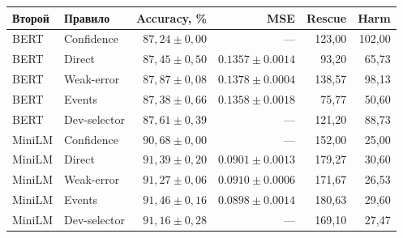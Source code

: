 \begin{tabular}{llrrrr}
\toprule
Второй & Правило & Accuracy, \% & MSE & Rescue & Harm \\
\midrule
BERT & Confidence & $87{,}24\pm0{,}00$ & --- & 123{,}00 & 102{,}00 \\
BERT & Direct & $87{,}45\pm0{,}50$ & $0.1357\pm0.0014$ & 93{,}20 & 65{,}73 \\
BERT & Weak-error & $87{,}87\pm0{,}08$ & $0.1378\pm0.0004$ & 138{,}57 & 98{,}13 \\
BERT & Events & $87{,}38\pm0{,}66$ & $0.1358\pm0.0018$ & 75{,}77 & 50{,}60 \\
BERT & Dev-selector & $87{,}61\pm0{,}39$ & --- & 121{,}20 & 88{,}73 \\
MiniLM & Confidence & $90{,}68\pm0{,}00$ & --- & 152{,}00 & 25{,}00 \\
MiniLM & Direct & $91{,}39\pm0{,}20$ & $0.0901\pm0.0013$ & 179{,}27 & 30{,}60 \\
MiniLM & Weak-error & $91{,}27\pm0{,}06$ & $0.0910\pm0.0006$ & 171{,}67 & 26{,}53 \\
MiniLM & Events & $91{,}46\pm0{,}16$ & $0.0898\pm0.0014$ & 180{,}63 & 29{,}60 \\
MiniLM & Dev-selector & $91{,}16\pm0{,}28$ & --- & 169{,}10 & 27{,}47 \\
\bottomrule
\end{tabular}
